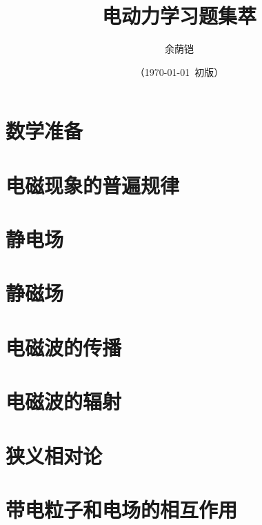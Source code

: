 \documentclass{electrodynamics}
\title{电动力学习题集萃}
\author{余荫铠}
\date{（\today~初版）}
\begin{document}
\maketitle



\setcounter{tocdepth}{0}
\tableofcontents

\setcounter{chapter}{-1}
\chapter{数学准备}
    
    
    
\chapter{电磁现象的普遍规律}
    
    
    
    
\chapter{静电场}
    

\chapter{静磁场}
    
    

\chapter{电磁波的传播}
    
    
    
    

\chapter{电磁波的辐射}
    
    

\chapter{狭义相对论}
    
    
    
    
    
    
\chapter{带电粒子和电场的相互作用}
    
    
    

\end{document}
